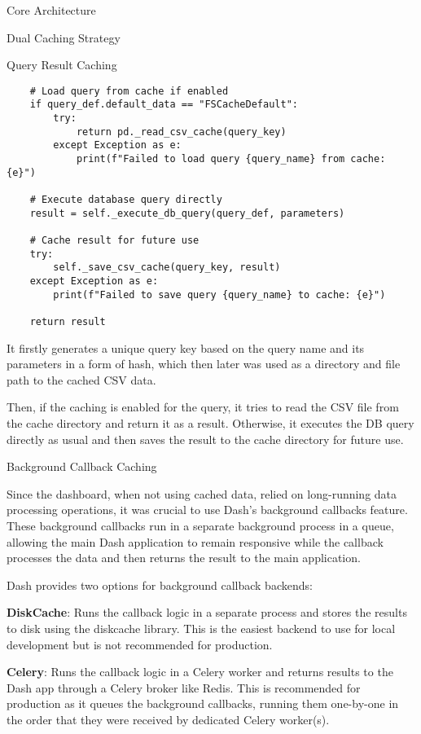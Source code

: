 \begin{section}{Core Architecture}
\begin{subsection}{Dual Caching Strategy}
\begin{subsubsection}{Query Result Caching}
\begin{listing}[h]
\begin{verbatim}
	# Load query from cache if enabled
    if query_def.default_data == "FSCacheDefault":
        try:
            return pd._read_csv_cache(query_key)
        except Exception as e:
            print(f"Failed to load query {query_name} from cache: {e}")

    # Execute database query directly
    result = self._execute_db_query(query_def, parameters)

    # Cache result for future use
    try:
        self._save_csv_cache(query_key, result)
    except Exception as e:
        print(f"Failed to save query {query_name} to cache: {e}")

    return result
				\end{verbatim}
				\label{lst:dashboard-implementation-query-cache}
			\end{listing}

			It firstly generates a unique query key based on the query name and its parameters in a form of hash, which then later was used as a directory and file path to the cached CSV data.

			Then, if the caching is enabled for the query, it tries to read the CSV file from the cache directory and return it as a result.
			Otherwise, it executes the DB query directly as usual and then saves the result to the cache directory for future use.
		\end{subsubsection}

		\pagebreak[4]

		\begin{subsubsection}{Background Callback Caching}
			\label{subsubsec:implementation-core-architecture-callback-cache}

			Since the dashboard, when not using cached data, relied on long-running data processing operations, it was crucial to use Dash's background callbacks feature.
			These background callbacks run in a separate background process in a queue,
			allowing the main Dash application to remain responsive while the callback processes the data and then returns the result to the main application\cite{plotly_dash_plotly_com_background_callbacks}.

			Dash provides two options for background callback backends:

			\textbf{DiskCache}: Runs the callback logic in a separate process and stores the results to disk using the diskcache library.
			This is the easiest backend to use for local development but is not recommended for production.

			\textbf{Celery}: Runs the callback logic in a Celery worker\cite{celery_userguide_workers} and returns results to the Dash app through a Celery broker like Redis.
			This is recommended for production as it queues the background callbacks, running them one-by-one in the order that they were received by dedicated Celery worker(s).


\end{subsubsection}
\end{subsection}
\end{section}
